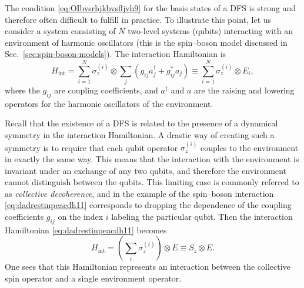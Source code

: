 \documentclass[3p,sort&compress]{elsarticle}
\newcommand{\op}[1]{#1}
\begin{document}
The condition \eqref{eq:OIbvsrhjkbvsfljvh9} for the basis states of a DFS is strong and therefore often difficult to fulfill in practice. To illustrate this point, let us consider a system consisting of $N$ two-level systems (qubits) interacting with an environment of harmonic oscillators (this is the spin--boson model discussed in Sec.~\ref{sec:spin-boson-models}). The interaction Hamiltonian is
%
\begin{equation}
  \label{eq:dadrestinpeacdh11}
  \op{H}_\text{int} =  \sum_{i=1}^N  \sigma_z^{(i)} \otimes \sum_j
  \left( g_{ij}a_j^\dagger + g_{ij}^* a_j \right) \equiv
  \sum_{i=1}^N  \sigma_z^{(i)} \otimes E_i,
\end{equation}
%  
where the $g_{ij}$ are coupling coefficients, and $a^\dagger$ and $a$ are the raising and lowering operators for the harmonic oscillators of the environment. 

Recall that the existence of a DFS is related to the presence of a dynamical symmetry in the interaction Hamiltonian. A drastic way of creating such a symmetry is to require that each qubit operator $\op{\sigma}_z^{(i)}$ couples to the environment in exactly the same way. This means that the interaction with the environment is invariant under an exchange of any two qubits, and therefore the environment cannot distinguish between the qubits. This limiting case is commonly referred to as \emph{collective decoherence}, and in the example of the spin--boson interaction \eqref{eq:dadrestinpeacdh11} corresponds to dropping the dependence of the coupling coefficients $g_{ij}$ on the index $i$ labeling the particular qubit. Then the interaction Hamiltonian \eqref{eq:dadrestinpeacdh11} becomes 
%
\begin{equation}
\label{eq:dadrestinpeacfxndh22}
\op{H}_\text{int} =  \left( \sum_{i} \sigma_z^{(i)} \right)
\otimes E \equiv
\op{S}_z \otimes E.
\end{equation}
%
One sees that this Hamiltonian represents an interaction between the collective spin operator and a single environment operator. 
\end{document}
